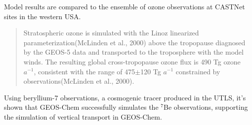 Model results are compared to the ensemble of ozone observations at CASTNet sites in the western USA.

\begin{quote}
Stratospheric ozone is simulated with the Linoz linearized parameterization(McLinden et al., 2000) above the tropopause diagnosed by the GEOS-5 data and transported to the troposphere with the model winds. The resulting global cross-tropopause ozone flux is 490 Tg ozone $a^{−1}$, consistent with the range of 475$\pm$120 Tg $a^{−1}$ constrained by observations(McLinden et al., 2000).
\end{quote}

Using beryllium-7 observations, a cosmogenic tracer produced in the UTLS, it's shown that GEOS-Chem successfully simulates the $^7$Be observations, supporting the simulation of vertical transport in GEOS-Chem.
